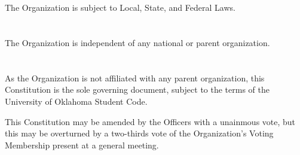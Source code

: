 \documentclass[12pt]{cls/constitution}
\begin{document}

\section{}
The Organization is subject to Local, State, and Federal Laws.

\section{}
The Organization is independent of any national or parent organization.

\section{}
As the Organization is not affiliated with any parent organization, this Constitution is the sole governing document, subject to the terms of the University of Oklahoma Student Code.

This Constitution may be amended by the Officers with a unainmous vote, but this may be overturned by a two-thirds vote of the Organization’s Voting Membership present at a general meeting. 
\end{document}
